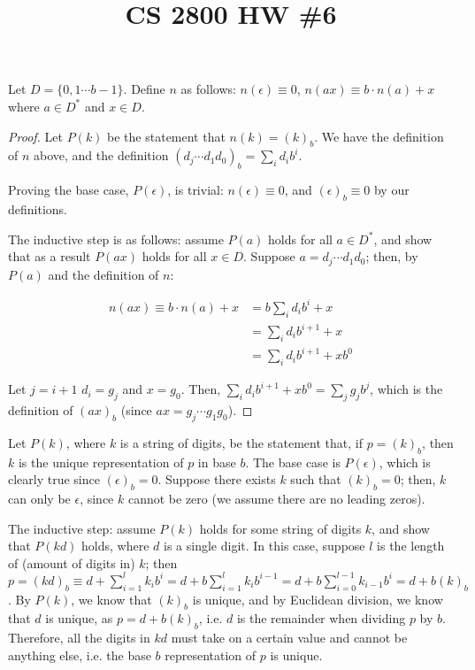

\title{CS 2800 HW \#6}
\author{\name}
\maketitle


Let $D = \{0, 1 \cdots b - 1\}$. Define $n$ as follows: $n(\epsilon) \equiv 0$, $n(ax) \equiv b \cdot n(a) + x$ where $a \in D^*$ and $x \in D$.

\begin{proof}
  Let $P(k)$ be the statement that $n(k) = (k)_b$. We have the definition of $n$ above, and the definition $(d_j \cdots d_1d_0)_b = \sum_i d_i b^i$.

  Proving the base case, $P(\epsilon)$, is trivial: $n(\epsilon) \equiv 0$, and $(\epsilon)_b \equiv 0$ by our definitions.

  The inductive step is as follows: assume $P(a)$ holds for all $a \in D^*$, and show that as a result $P(ax)$ holds for all $x \in D$. Suppose $a = d_j \cdots d_1d_0$; then, by $P(a)$ and the definition of $n$:

  \begin{align*}
    n(ax) \equiv b \cdot n(a) + x &= b\sum_i d_i b^i + x \\
    &= \sum_i d_i b^{i + 1} + x \\
    &= \sum_i d_i b^{i + 1} + x b^0
  \end{align*}

  Let $j = i + 1$ $d_i = g_j$ and $x = g_0$. Then, $\sum_i d_i b^{i + 1} + x b^0 = \sum_j g_j b^j$, which is the definition of $(ax)_b$ (since $ax = g_j \cdots g_1 g_0$).
\end{proof}


Let $P(k)$, where $k$ is a string of digits, be the statement that, if $p = (k)_b$, then $k$ is the unique representation of $p$ in base $b$. The base case is $P(\epsilon)$, which is clearly true since $(\epsilon)_b = 0$. Suppose there exists $k$ such that $(k)_b = 0$; then, $k$ can only be $\epsilon$, since $k$ cannot be zero (we assume there are no leading zeros).

The inductive step: assume $P(k)$ holds for some string of digits $k$, and show that $P(kd)$ holds, where $d$ is a single digit. In this case, suppose $l$ is the length of (amount of digits in) $k$; then $p = (kd)_b \equiv d + \sum_{i = 1}^l k_i b^i = d + b\sum_{i = 1}^l k_i b^{i - 1} = d + b\sum_{i = 0}^{l - 1} k_{i - 1} b^i = d + b(k)_b$. By $P(k)$, we know that $(k)_b$ is unique, and by Euclidean division, we know that $d$ is unique, as $p = d + b(k)_b$, i.e. $d$ is the remainder when dividing $p$ by $b$. Therefore, all the digits in $kd$ must take on a certain value and cannot be anything else, i.e. the base $b$ representation of $p$ is unique.

